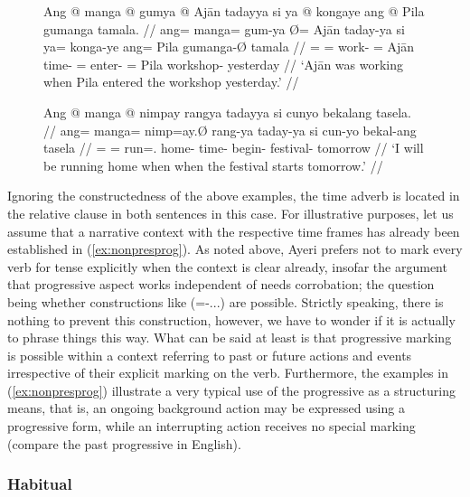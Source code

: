 \begin{figure}
\pex\label{ex:nonpresprog}
\a\label{ex:pastprog}\begingl
	\gla Ang @ manga @ gumya {} @ Ajān tadayya si ya @ kongaye ang @ Pila
		gumanga tamala. //
	\glb ang= manga= gum-ya Ø= Ajān taday-ya si ya= konga-ye ang= Pila 
		gumanga-Ø tamala //
	\glc \AgtT{}= \Prog{}= work-\Tsg{} \Top{}= Ajān time-\Loc{} \Rel{} \LocT{}=
		enter-\TsgF{} \Aarg{}= Pila workshop-\Top{} yesterday //
	\glft `Ajān was working when Pila entered the workshop yesterday.' //
\endgl

\a\label{ex:futprog}\begingl
	\gla Ang @ manga @ nimpay rangya tadayya si cunyo bekalang tasela. //
	\glb ang= manga= nimp=ay.Ø rang-ya taday-ya si cun-yo bekal-ang tasela //
	\glc \AgtT{}= \Prog{}= run=\Fsg{}.\Top{} home-\Loc{}
		time-\Loc{} \Rel{} begin-\TsgN{} festival-\Aarg{} tomorrow //
	\glft `I will be running home when when the festival starts 
		tomorrow.' //
\endgl
\xe
\end{figure}

Ignoring the constructedness of the above examples, the time adverb is located 
in the relative clause in both sentences in this case. For illustrative 
purposes, let us assume that a narrative context with the respective time 
frames has already been established in (\ref{ex:nonpresprog}). As noted above, 
Ayeri prefers not to mark every verb for tense explicitly when the context is 
clear already, insofar the argument that progressive aspect works independent 
of  needs corrobation; the question being whether constructions like 
 (\Prog{}=\Pst{}-...) are possible. Strictly 
speaking, there is nothing to prevent this construction, however, we have to 
wonder if it is actually  to phrase things this way. What can be 
said at least is that progressive marking is possible within a context 
referring to past or future actions and events irrespective of their explicit 
marking on the verb. Furthermore, the examples in (\ref{ex:nonpresprog}) 
illustrate a very typical use of the progressive as a structuring means, that 
is, an ongoing background action may be expressed using a progressive form, 
while an interrupting action receives no special marking (compare the past 
progressive in English).


\subsubsection{Habitual}

